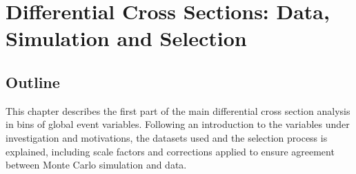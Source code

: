 \chapter{Differential Cross Sections: Data, Simulation and Selection}
\label{c:Differential_Cross_Section:data_simulation_and_selection}

\section{Outline}
\label{s:analysis1_outline}
This chapter describes the first part of the main \ttbar differential cross section analysis in bins of global
event variables. Following an introduction to the variables under investigation and motivations, the datasets
used and the selection process is explained, including scale factors and corrections applied to ensure
agreement between Monte Carlo simulation and data.


